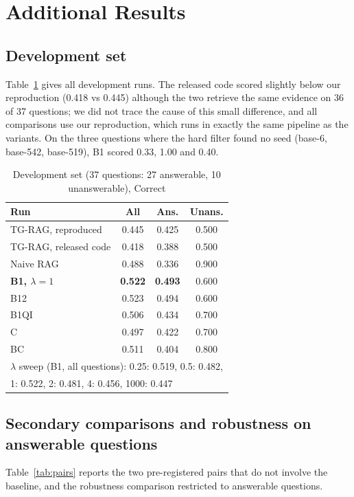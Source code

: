 \fi
\section{Additional Results}
\subsection{Development set}
Table~\ref{tab:dev} gives all development runs. The released code scored slightly below our reproduction (0.418 vs 0.445) although the two retrieve the same evidence on 36 of 37 questions; we did not trace the cause of this small difference, and all comparisons use our reproduction, which runs in exactly the same pipeline as the variants. On the three questions where the hard filter found no seed (base-6, base-542, base-519), B1 scored 0.33, 1.00 and 0.40.

\begin{table}[t]
\centering
\caption{Development set (37 questions: 27 answerable, 10 unanswerable), Correct}
\label{tab:dev}
\begin{tabular}{lccc}
\toprule
Run & All & Ans. & Unans. \\
\midrule
TG-RAG, reproduced & 0.445 & 0.425 & 0.500 \\
TG-RAG, released code & 0.418 & 0.388 & 0.500 \\
Naive RAG & 0.488 & 0.336 & 0.900 \\
\textbf{B1, $\lambda = 1$} & \textbf{0.522} & \textbf{0.493} & 0.600 \\
B12 & 0.523 & 0.494 & 0.600 \\
B1QI & 0.506 & 0.434 & 0.700 \\
C & 0.497 & 0.422 & 0.700 \\
BC & 0.511 & 0.404 & 0.800 \\
\midrule
\multicolumn{4}{l}{$\lambda$ sweep (B1, all questions): 0.25: 0.519, 0.5: 0.482,} \\
\multicolumn{4}{l}{1: 0.522, 2: 0.481, 4: 0.456, 1000: 0.447} \\
\bottomrule
\end{tabular}
\end{table}

\subsection{Secondary comparisons and robustness on answerable questions}
Table~\ref{tab:pairs} reports the two pre-registered pairs that do not involve the baseline, and the robustness comparison restricted to answerable questions.

